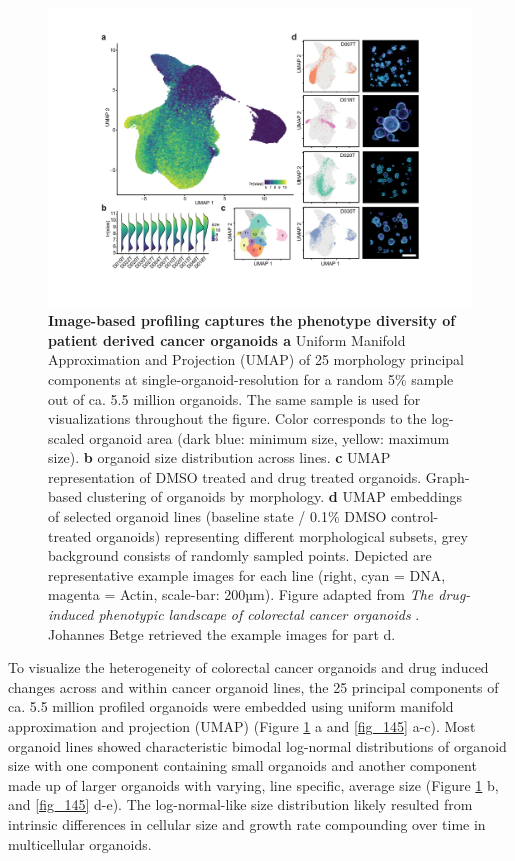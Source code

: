 \begin{flushleft}
\begin{figure}[h]
\centering
\includegraphics[width=\textwidth,
                height=\textheight,
                keepaspectratio]{figures/promise/pdf/fig_1_4.pdf}
\caption[Image-based profiling captures the phenotype diversity of patient derived cancer organoids]{\textbf{Image-based profiling captures the phenotype diversity of patient derived cancer organoids a} Uniform Manifold Approximation and Projection (UMAP) of 25 morphology principal components at single-organoid-resolution for a random 5\% sample out of ca. 5.5 million organoids. The same sample is used for visualizations throughout the figure. Color corresponds to the log-scaled organoid area (dark blue: minimum size, yellow: maximum size). \textbf{b} organoid size distribution across lines. \textbf{c} UMAP representation of DMSO treated and drug treated organoids. Graph-based clustering of organoids by morphology. \textbf{d} UMAP embeddings of selected organoid lines (baseline state / 0.1\% DMSO control-treated organoids) representing different morphological subsets, grey background consists of randomly sampled points. Depicted are representative example images for each line (right, cyan = DNA, magenta = Actin, scale-bar: 200µm). Figure adapted from \textit{The drug-induced phenotypic landscape of colorectal cancer organoids} \parencite{betgeDruginducedPhenotypicLandscape2022}. Johannes Betge retrieved the example images for part d.}
\label{fig_140}
\end{figure}
\bigbreak

To visualize the heterogeneity of colorectal cancer organoids and drug induced changes across and within cancer organoid lines, the 25 principal components of  ca. 5.5 million profiled organoids were embedded using uniform manifold approximation and projection (UMAP) (Figure \ref{fig_140} a and \ref{fig_145} a-c). Most organoid lines showed characteristic bimodal log-normal distributions of organoid size with one component containing small organoids and another component made up of larger organoids with varying, line specific, average size (Figure \ref{fig_140} b, and \ref{fig_145} d-e). The log-normal-like size distribution likely resulted from intrinsic differences in cellular size and growth rate compounding over time in multicellular organoids. 


\end{flushleft}
